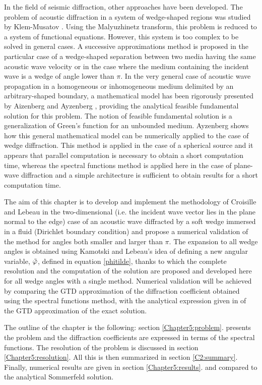 In the field of seismic diffraction, other approaches have been developed. The problem of acoustic diffraction in a system of wedge-shaped regions was studied by Klem-Musatov \cite{Klem-Musatov}. Using the Malyuzhinetz transform, this problem is reduced to a system of functional equations. However, this system is too complex to be solved in general cases. A successive approximations method is proposed in the particular case of a wedge-shaped separation between two media having the same acoustic wave velocity or  in the case where the medium containing the incident wave is a wedge of angle lower than $\pi$. In the very general case of acoustic wave propagation in a homogeneous or inhomogeneous medium delimited by an arbitrary-shaped boundary, a mathematical model has been rigorously presented by Aizenberg and Ayzenberg \cite{Aizenberg}, providing the analytical feasible fundamental solution for this problem. The notion of feasible fundamental solution is a generalization of Green's function for an unbounded medium. Ayzenberg \cite{Ayzenberg} shows how this general mathematical model can be numerically applied to the case of wedge diffraction. This method is applied in the case of a spherical source and it appears that parallel computation is necessary to obtain a short computation time, whereas the spectral functions method is applied here in the case of plane-wave diffraction and a simple architecture is sufficient to obtain results for a short computation time. 

The aim of this chapter is to develop and implement the methodology of Croisille and Lebeau \cite{CroisilleLebeau} in the two-dimensional (i.e. the incident wave vector lies in the plane normal to the edge) case of an acoustic wave diffracted by a soft wedge immersed in a fluid (Dirichlet boundary condition) and propose a numerical validation of the method for angles both smaller and larger than $\pi$.  The expansion to all wedge angles is obtained using Kamotski and Lebeau's \cite{KamotskiLebeau} idea of defining a new angular variable, $\tilde{\varphi}$, defined in equation \eqref{phitilde}, thanks to which the complete resolution and the computation of the solution are proposed and developed here for all wedge angles with a single method. Numerical validation will be achieved by comparing the GTD approximation of the diffraction coefficient obtained using the spectral functions method, with the analytical expression given in \cite{Bouche,Bo} of the GTD approximation of the exact solution. 

The outline of the chapter is the following: section \ref{Chapter5:problem}. presents the problem and the diffraction coefficients are expressed in terms of the spectral functions. The resolution of the problem is discussed in section \ref{Chapter5:resolution}. All this is then summarized in section \ref{C2:summary}. Finally, numerical results are given in section \ref{Chapter5:results}. and compared to the analytical Sommerfeld solution. 

